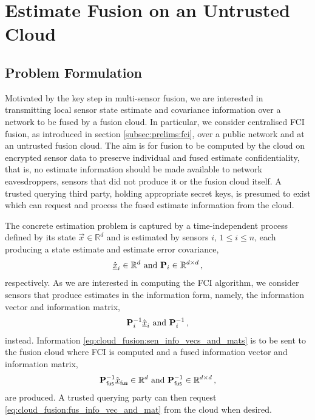 
\chapter{Estimate Fusion on an Untrusted Cloud}\label{ch:cloud_fusion}

% 
%                                              
%                                              
%                                              
% 

\section{Problem Formulation}\label{sec:cloud_fusion:problem}
Motivated by the key step in multi-sensor fusion, we are interested in transmitting local sensor state estimate and covariance information over a network to be fused by a fusion cloud. In particular, we consider centralised FCI fusion, as introduced in section \ref{subsec:prelims:fci}, over a public network and at an untrusted fusion cloud. The aim is for fusion to be computed by the cloud on encrypted sensor data to preserve individual and fused estimate confidentiality, that is, no estimate information should be made available to network eavesdroppers, sensors that did not produce it or the fusion cloud itself. A trusted querying third party, holding appropriate secret keys, is presumed to exist which can request and process the fused estimate information from the cloud.

The concrete estimation problem is captured by a time-independent process defined by its state $\vec{x} \in \mathbb{R}^d$ and is estimated by sensors $i$, $1\leq i\leq n$, each producing a state estimate and estimate error covariance,
\begin{equation}
    \hat{{\underline{x}}}_i \in \mathbb{R}^d \text{ and } {\ensuremath{{\mathbf{P}}}}_i \in \mathbb{R}^{d\times d}\,,
\end{equation}
respectively. As we are interested in computing the FCI algorithm, we consider sensors that produce estimates in the information form, namely, the information vector and information matrix,
\begin{equation}\label{eq:cloud_fusion:sen_info_vecs_and_mats}
    {\ensuremath{{\mathbf{P}}}}_i^{-1}\hat{{\underline{x}}}_i \text{ and } {\ensuremath{{\mathbf{P}}}}_i^{-1}\,,
\end{equation}
instead. Information \eqref{eq:cloud_fusion:sen_info_vecs_and_mats} is to be sent to the fusion cloud where FCI is computed and a fused information vector and information matrix,
\begin{equation}\label{eq:cloud_fusion:fus_info_vec_and_mat}
    {\ensuremath{{\mathbf{P}}}}_{\mathsf{fus}}^{-1}\hat{{\underline{x}}}_{\mathsf{fus}} \in \mathbb{R}^d \text{ and } {\ensuremath{{\mathbf{P}}}}_{\mathsf{fus}}^{-1} \in \mathbb{R}^{d\times d}\,,
\end{equation}
are produced. A trusted querying party can then request \eqref{eq:cloud_fusion:fus_info_vec_and_mat} from the cloud when desired.

